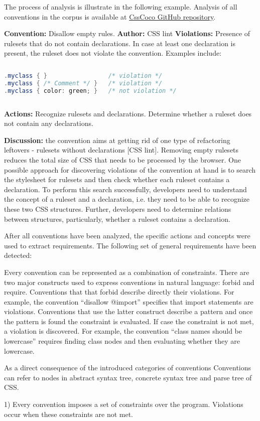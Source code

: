 \documentclass[parskip=full]{uvamscse}
\begin{document}
The process of analysis is illustrate in the following example. Analysis of all conventions in the
corpus is available at \href{https://github.com/boryanagoncharenko/CssCoco/blob/master/analysis.md}{CssCoco GitHub repository}.

\textbf{Convention:} Disallow empty rules.
\textbf{Author:} CSS lint
\textbf{Violations:} Presence of rulesets that do not contain declarations. In case at least one declaration is present, the ruleset does not violate the convention. Examples include:
\begin{sourcecode}
\begin{lstlisting}[style=mono,language=Java]
.myclass { }                 /* violation */
.myclass { /* Comment */ }   /* violation */
.myclass { color: green; }   /* not violation */
\end{lstlisting}
\end{sourcecode}

\textbf{Actions:} Recognize rulesets and declarations. Determine whether a ruleset does not contain any declarations.

\textbf{Discussion:} the convention aims at getting rid of one type of refactoring leftovers -
rulesets without declarations [CSS lint]. Removing empty rulesets reduces the total size of CSS that
needs to be processed by the browser. One possible approach for discovering violations of the
convention at hand is to search the stylesheet for rulesets and then check whether each ruleset
contains a declaration. To perform this search successfully, developers need to understand the
concept of a ruleset and a declaration, i.e. they need to be able to recognize these two CSS
structures. Further, developers need to determine relations between structures, particularly,
whether a ruleset contains a declaration.

After all conventions have been analyzed, the specific actions and concepts were used to extract requirements. The following set of general requirements have been detected:

\begin{description}
  \item Every convention can be represented as a combination of constraints. There are two major constructs used to express conventions in natural language: forbid and require. Conventions that that forbid describe directly their violations. For example, the convention ``disallow @import'' specifies that import statements are violations. Conventions that use the latter construct describe a pattern and once the pattern is found the constraint is evaluated. If case the constraint is not met, a violation is discovered. For example, the convention ``class names should be lowercase'' requires finding class nodes and then evaluating whether they are lowercase. 

  \item As a direct consequence of the introduced categories of conventions Conventions can refer to nodes in abstract syntax tree, concrete syntax tree and parse tree of
CSS.
\end{description}
1) Every convention imposes a set of constraints over the program. Violations occur when these
constraints are not met.
\end{document}
